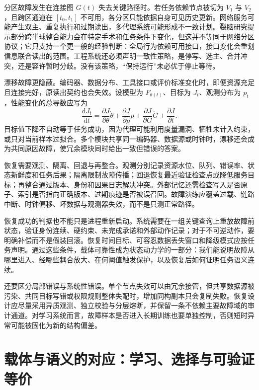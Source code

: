 分区故障发生在连接图 $G(t)$ 失去关键路径时。若任务依赖节点被切为 $V_1$ 与 $V_2$，且跨区通道在 $[t_0,t_1]$ 不可用，各分区只能依据自身可见历史更新。网络服务可能产生双主、重复执行和过期读出，多代理系统可能形成不一致计划。裂脑研究提示部分跨半球整合能力会在特定手术和任务条件下变化，但这并不等同于网络分区协议；它只支持一个更一般的经验判断：全局行为依赖可用接口，接口变化会重划信息联合读出的范围。工程系统还必须声明一致性策略，是停写、选主、合并冲突，还是容许暂时分歧。没有该策略，“保持运行”未必优于停止等待。

漂移故障更隐蔽。编码器、数据分布、工具接口或评价标准变化时，即便资源充足且连接完好，原读出契约也会失效。设模型为 $F_{\theta(t)}$、目标为 $J_t$、观测分布为 $p_t$，性能变化的总导数应写为
\[
\frac{\mathrm dJ_t}{\mathrm dt}=\frac{\partial J}{\partial\theta}\dot\theta+
\frac{\partial J}{\partial p}\dot p+
\frac{\partial J}{\partial G}\dot G+\frac{\partial J}{\partial t}.
\]
目标值下降不自动等于任务成功，因为代理可能利用度量漏洞、牺牲未计入约束，或只对当前样本过拟合。多个模块共享同一编码器、数据源或时钟时，漂移还会成为共同原因故障，使冗余模块同时给出一致但错误的答案。

恢复需要观测、隔离、回退与再整合。观测分别记录资源水位、队列、错误率、状态新鲜度和任务后果；隔离限制故障传播；回退恢复最近验证检查点或降低服务目标；再整合通过版本、身份和因果日志解决冲突。外部记忆还需检查写入是否原子、索引是否指向正确版本、过期痕迹是否被误召回。故障演练应覆盖过载、链路中断、时钟偏移、坏数据与观测器失效，而不是只测正常路径。

恢复成功的判据也不能只是进程重新启动。系统需要在一组关键查询上重放故障前状态，验证身份连续、硬约束、未完成承诺和外部动作记录；对于不可逆动作，要明确补偿而不是假装回滚。恢复时间目标、可容忍数据丢失窗口和降级模式应按任务声明。通过这些条件，载体可靠性成为状态动力学的一部分：我们能说明故障从哪里进入、经哪些耦合放大、在何阈值触发保护，以及恢复后如何证明任务语义连续。

还要区分局部错误与系统性错误。单个节点失效可以由冗余接管，但共享数据源被污染、共同目标写错或权限规则整体失配时，增加同构副本只会复制失败。恢复设计应尽量采用异质观测、独立校验与分层熔断，并保留一条不依赖主要故障域的审计通道。对学习系统而言，故障样本是否进入长期训练也要单独控制，否则短时异常可能被固化为新的结构偏差。

\section{载体与语义的对应：学习、选择与可验证等价}
\label{sec:absolute_decoupling_and_forced_isomorphism}

